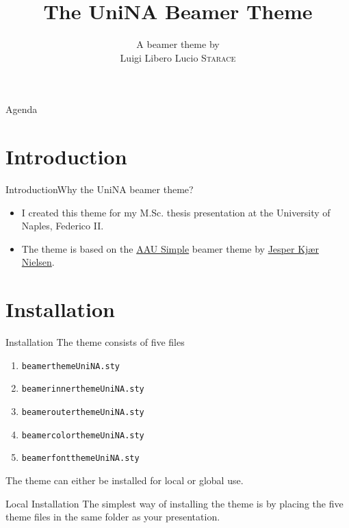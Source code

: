 \documentclass[10pt,aspectratio=43
	]{beamer}
\title[The UniNA Beamer Theme] %
	{The UniNA Beamer Theme} %
\author[Luigi Libero Lucio Starace]%
	{%
		{\footnotesize A beamer theme by}\\
		Luigi Libero Lucio \textsc{Starace}%
	}
\institute[
		Department of Electrical Engineering and Information Technology\\
		Università degli Studi di Napoli Federico II\\
		Italy
	]
	{%
		Università degli Studi di Napoli Federico II
	}
\begin{document}
	\maketitle

	\begin{frame}{Agenda}{}
		\tableofcontents
	\end{frame}

	\section{Introduction}
	\begin{frame}{Introduction}{Why the UniNA beamer theme?}
			\begin{itemize}[<+->]
				\item I created this theme for my M.Sc. thesis presentation at the University of Naples, Federico II.
				\item The theme is based on the \href{https://github.com/jkjaer/aauLatexTemplates/tree/master/aauBeamer/aausimplerg}{\alert{AAU Simple}} beamer theme by 
				\href{https://github.com/jkjaer}{\alert{Jesper Kjær Nielsen}}.
			\end{itemize}
	\end{frame}

	\section{Installation}
	\begin{frame}{Installation}
	The theme consists of five files
	\begin{enumerate}
		\item {\tt beamerthemeUniNA.sty}
		\item {\tt beamerinnerthemeUniNA.sty}
		\item {\tt beamerouterthemeUniNA.sty}
		\item {\tt beamercolorthemeUniNA.sty}
		\item {\tt beamerfontthemeUniNA.sty}
	\end{enumerate}
	The theme can either be installed for local or global use.
	\pause
	\begin{block}{Local Installation}
		The simplest way of installing the theme is by placing the five theme files in the same 
		folder as your presentation.
	\end{block}
	\end{frame}
\end{document}
